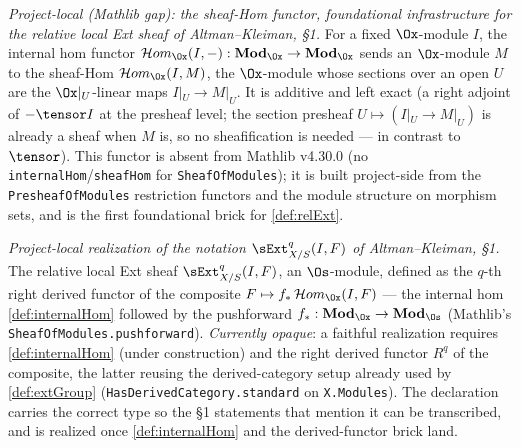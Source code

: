 \begin{definition}
  \label{def:internalHom}
  \textit{Project-local (Mathlib gap): the sheaf-Hom functor, foundational
  infrastructure for the relative local Ext sheaf of Altman--Kleiman, §1.}
  For a fixed $\Ox$-module $I$, the internal hom functor
  $\mathcal{H}om_{\Ox}(I,-) : \mathbf{Mod}_{\Ox} \to \mathbf{Mod}_{\Ox}$ sends an
  $\Ox$-module $M$ to the sheaf-Hom $\mathcal{H}om_{\Ox}(I,M)$, the
  $\Ox$-module whose sections over an open $U$ are the $\Ox|_U$-linear maps
  $I|_U \to M|_U$. It is additive and left exact (a right adjoint of $-\tensor I$
  at the presheaf level; the section presheaf $U \mapsto (I|_U \to M|_U)$ is already
  a sheaf when $M$ is, so no sheafification is needed — in contrast to $\tensor$).
  This functor is absent from Mathlib v4.30.0 (no \texttt{internalHom}/\texttt{sheafHom}
  for \texttt{SheafOfModules}); it is built project-side from the
  \texttt{PresheafOfModules} restriction functors and the module structure on
  morphism sets, and is the first foundational brick for \cref{def:relExt}.
\end{definition}

\begin{definition}
  \label{def:relExt}
  \textit{Project-local realization of the notation $\sExt^q_{X/S}(I,F)$ of Altman--Kleiman, §1.}
  The relative local Ext sheaf $\sExt^q_{X/S}(I,F)$, an $\Os$-module, defined as the
  $q$-th right derived functor of the composite
  $F \mapsto f_*\,\mathcal{H}om_{\Ox}(I,F)$ — the internal hom
  \cref{def:internalHom} followed by the pushforward
  $f_* : \mathbf{Mod}_{\Ox} \to \mathbf{Mod}_{\Os}$ (Mathlib's
  \texttt{SheafOfModules.pushforward}). \emph{Currently opaque}: a faithful
  realization requires \cref{def:internalHom} (under construction) and the right
  derived functor $R^q$ of the composite, the latter reusing the derived-category
  setup already used by \cref{def:extGroup}
  (\texttt{HasDerivedCategory.standard} on \texttt{X.Modules}). The declaration
  carries the correct type so the §1 statements that mention it can be transcribed,
  and is realized once \cref{def:internalHom} and the derived-functor brick land.
\end{definition}

